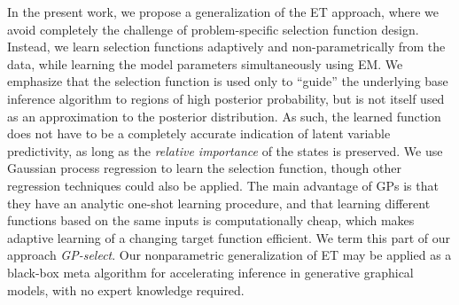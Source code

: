 In the present work, we propose a generalization of the ET approach, where
we avoid completely the challenge of problem-specific selection function design.
Instead, we learn selection functions  adaptively and non-parametrically
from the data,
 while learning the model
parameters  simultaneously using EM.
We emphasize that the selection function is  used only to ``guide'' the underlying
base inference algorithm to regions of high posterior probability, but is not itself
used as an approximation to the posterior distribution. 
As such, the learned
function does not have to be a completely accurate indication of latent
variable predictivity,
as long as the \emph{relative importance} of the states  is preserved.
We use  Gaussian process
regression \citep{RasmussenGPbook} to learn the selection function, though other regression techniques could
also be applied. The main advantage of GPs
is that they have an analytic one-shot learning procedure, and that learning different
functions based on the same inputs is computationally cheap, which makes adaptive learning
of a changing target function efficient. We term this part of our approach
\textit{GP-select}.
Our nonparametric generalization of  ET may be applied as a black-box
meta algorithm for accelerating inference in  generative graphical models,
with no expert knowledge required.









